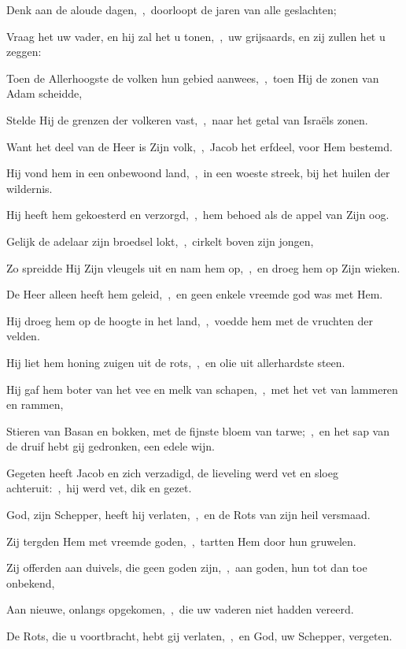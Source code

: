 \documentclass[12pt,twoside,a5paper]{article}
\begin{document}
\begin{halfparskip}

  Denk aan de aloude dagen,~\sep\ doorloopt de jaren van alle geslachten;

  Vraag het uw vader, en hij zal het u tonen,~\sep\ uw grijsaards, en zij zullen het u zeggen:

  Toen de Allerhoogste de volken hun gebied aanwees,~\sep\ toen Hij de zonen van Adam scheidde,

  Stelde Hij de grenzen der volkeren vast,~\sep\ naar het getal van Israëls zonen.

  Want het deel van de Heer is Zijn volk,~\sep\ Jacob het erfdeel, voor Hem bestemd.

  Hij vond hem in een onbewoond land,~\sep\ in een woeste streek, bij het huilen der wildernis.

  Hij heeft hem gekoesterd en verzorgd,~\sep\ hem behoed als de appel van Zijn oog.

  Gelijk de adelaar zijn broedsel lokt,~\sep\ cirkelt boven zijn jongen,

  Zo spreidde Hij Zijn vleugels uit en nam hem op,~\sep\ en droeg hem op Zijn wieken.

  De Heer alleen heeft hem geleid,~\sep\ en geen enkele vreemde god was met Hem.

  Hij droeg hem op de hoogte in het land,~\sep\ voedde hem met de vruchten der velden.

  Hij liet hem honing zuigen uit de rots,~\sep\ en olie uit allerhardste steen.

  Hij gaf hem boter van het vee en melk van schapen,~\sep\ met het vet van lammeren en rammen,

  Stieren van Basan en bokken, met de fijnste bloem van tarwe;~\sep\ en het sap van de druif hebt gij gedronken, een edele wijn.
\end{halfparskip}

\begin{halfparskip}

  Gegeten heeft Jacob en zich verzadigd, de lieveling werd vet en sloeg achteruit:~\sep\ hij werd vet, dik en gezet.

  God, zijn Schepper, heeft hij verlaten,~\sep\ en de Rots van zijn heil versmaad.

  Zij tergden Hem met vreemde goden,~\sep\ tartten Hem door hun gruwelen.

  Zij offerden aan duivels, die geen goden zijn,~\sep\ aan goden, hun tot dan toe onbekend,

  Aan nieuwe, onlangs opgekomen,~\sep\ die uw vaderen niet hadden vereerd.

  De Rots, die u voortbracht, hebt gij verlaten,~\sep\ en God, uw Schepper, vergeten.
\end{halfparskip}
\end{document}
